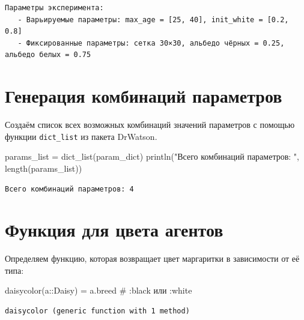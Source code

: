 \documentclass[
  12pt,
  a4paper,
  DIV=11,
  numbers=noendperiod]{scrreprt}
\newenvironment{Shaded}{\begin{snugshade}}{\end{snugshade}}
\newcommand{\CommentTok}[1]{\textcolor[rgb]{0.37,0.37,0.37}{#1}}
\newcommand{\DataTypeTok}[1]{\textcolor[rgb]{0.68,0.00,0.00}{#1}}
\newcommand{\FunctionTok}[1]{\textcolor[rgb]{0.28,0.35,0.67}{#1}}
\newcommand{\NormalTok}[1]{\textcolor[rgb]{0.00,0.23,0.31}{#1}}
\newcommand{\OperatorTok}[1]{\textcolor[rgb]{0.37,0.37,0.37}{#1}}
\newcommand{\StringTok}[1]{\textcolor[rgb]{0.13,0.47,0.30}{#1}}
\begin{document}
\begin{verbatim}
Параметры эксперимента:
   - Варьируемые параметры: max_age = [25, 40], init_white = [0.2, 0.8]
   - Фиксированные параметры: сетка 30×30, альбедо чёрных = 0.25, альбедо белых = 0.75
\end{verbatim}

\section{Генерация комбинаций
параметров}\label{ux433ux435ux43dux435ux440ux430ux446ux438ux44f-ux43aux43eux43cux431ux438ux43dux430ux446ux438ux439-ux43fux430ux440ux430ux43cux435ux442ux440ux43eux432}

Создаём список всех возможных комбинаций значений параметров с помощью
функции \texttt{dict\_list} из пакета DrWatson.

\begin{Shaded}
\begin{Highlighting}[]
\NormalTok{params\_list }\OperatorTok{=} \FunctionTok{dict\_list}\NormalTok{(param\_dict)}
\FunctionTok{println}\NormalTok{(}\StringTok{"Всего комбинаций параметров: "}\NormalTok{, }\FunctionTok{length}\NormalTok{(params\_list))}
\end{Highlighting}
\end{Shaded}

\begin{verbatim}
Всего комбинаций параметров: 4
\end{verbatim}

\section{Функция для цвета
агентов}\label{ux444ux443ux43dux43aux446ux438ux44f-ux434ux43bux44f-ux446ux432ux435ux442ux430-ux430ux433ux435ux43dux442ux43eux432}

Определяем функцию, которая возвращает цвет маргаритки в зависимости от
её типа:

\begin{Shaded}
\begin{Highlighting}[]
\FunctionTok{daisycolor}\NormalTok{(a}\OperatorTok{::}\DataTypeTok{Daisy}\NormalTok{) }\OperatorTok{=}\NormalTok{ a.breed  }\CommentTok{\# :black или :white}
\end{Highlighting}
\end{Shaded}

\begin{verbatim}
daisycolor (generic function with 1 method)
\end{verbatim}
\end{document}
